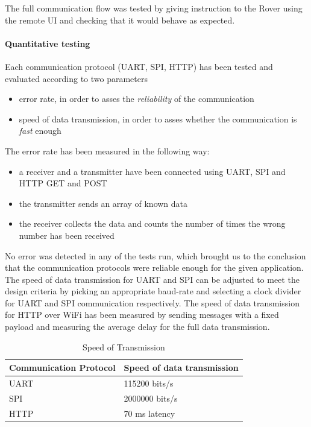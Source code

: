\documentclass[10pt,twoside]{article}
\begin{document}
The full communication flow was tested by giving instruction to the Rover using the remote UI and checking that it would behave as expected.

\paragraph{Quantitative testing}
Each communication protocol (UART, SPI, HTTP) has been tested and evaluated according to two parameters
\begin{itemize}
    \item error rate, in order to asses the \emph{reliability} of the communication
    \item speed of data transmission, in order to asses whether the communication is \emph{fast} enough
\end{itemize}

The error rate has been measured in the following way:
\begin{itemize}[noitemsep]
    \item a receiver and a transmitter have been connected using UART, SPI and HTTP GET and POST
    \item the transmitter sends an array of known data
    \item the receiver collects the data and counts the number of times the wrong number has been received
\end{itemize}

No error was detected in any of the tests run, which brought us to the conclusion that the communication protocols were reliable enough for the given application.
\smallskip
The speed of data transmission for UART and SPI can be adjusted to meet the design criteria by picking an appropriate baud-rate and selecting a clock divider for UART and SPI communication respectively.
The speed of data transmission for HTTP over WiFi has been measured by sending messages with a fixed payload and measuring the average delay for the full data transmission.

\begin{table}[hbt]
\centering
\renewcommand{\arraystretch}{1.3}
\begin{tabular}{@{}ll@{}}
\toprule
Communication   Protocol & Speed of data   transmission \\ \midrule
UART                     & 115200 bits/s                \\
SPI                      & 2000000   bits/s             \\
HTTP                     & 70 ms latency                  \\ \bottomrule
\end{tabular}
\caption{Speed of Transmission}
\end{table}
\end{document}
